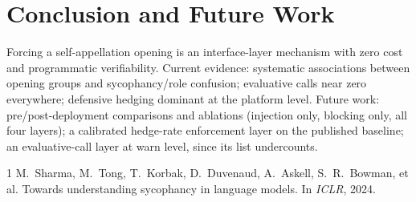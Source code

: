 \documentclass[10pt,twocolumn]{article}
\begin{document}
\section{Conclusion and Future Work}
Forcing a self-appellation opening is an interface-layer mechanism with zero cost and
programmatic verifiability. Current evidence: systematic associations between opening
groups and sycophancy/role confusion; evaluative calls near zero everywhere; defensive
hedging dominant at the platform level. Future work: pre/post-deployment comparisons
and ablations (injection only, blocking only, all four layers); a calibrated hedge-rate
enforcement layer on the published baseline; an evaluative-call layer at warn level,
since its list undercounts.

\begin{thebibliography}{1}
M.~Sharma, M.~Tong, T.~Korbak, D.~Duvenaud, A.~Askell, S.~R.~Bowman, et al.
\newblock Towards understanding sycophancy in language models.
\newblock In \emph{ICLR}, 2024.
\end{thebibliography}
\end{document}
